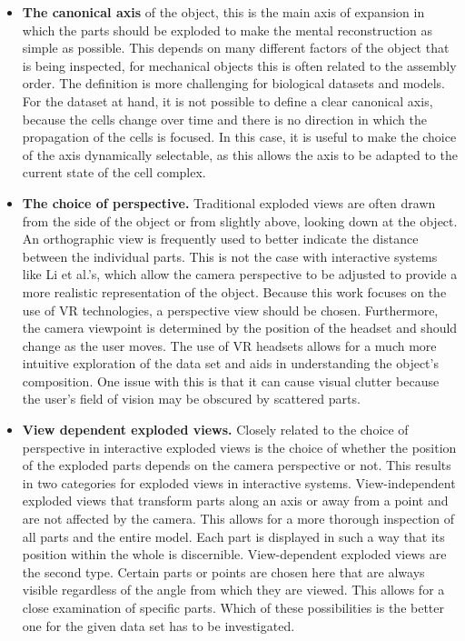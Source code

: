 \begin{itemize}
	\item \textbf{The canonical axis} of the object, this is the main axis of expansion in which the parts should be exploded to make the mental reconstruction as simple as possible. This depends on many different factors of the object that is being inspected, for mechanical objects this is often related to the assembly order. The definition is more challenging for biological datasets and models. For the dataset at hand, it is not possible to define a clear canonical axis, because the cells change over time and there is no direction in which the propagation of the cells is focused. In this case, it is useful to make the choice of the axis dynamically selectable, as this allows the axis to be adapted to the current state of the cell complex. 
	\item \textbf{The choice of perspective.} Traditional exploded views are often drawn from the side of the object or from slightly above, looking down at the object. An orthographic view is frequently used to better indicate the distance between the individual parts. 
	This is not the case with interactive systems like Li et al.'s, which allow the camera perspective to be adjusted to provide a more realistic representation of the object.\cite{Wilmot_Li_2008}
	Because this work focuses on the use of VR technologies, a perspective view should be chosen. 
	Furthermore, the camera viewpoint is determined by the position of the headset and should change as the user moves. 
	The use of VR headsets allows for a much more intuitive exploration of the data set and aids in understanding the object's composition. 
	One issue with this is that it can cause visual clutter because the user's field of vision may be obscured by scattered parts.
	\item \textbf{View dependent exploded views.} Closely related to the choice of perspective in interactive exploded views is the choice of whether the position of the exploded parts depends on the camera perspective or not. 
	This results in two categories for exploded views in interactive systems.
	View-independent exploded views that transform parts along an axis or away from a point and are not affected by the camera.
	This allows for a more thorough inspection of all parts and the entire model. 
	Each part is displayed in such a way that its position within the whole is discernible.
	View-dependent exploded views are the second type.
	Certain parts or points are chosen here that are always visible regardless of the angle from which they are viewed. 
	This allows for a close examination of specific parts.
	Which of these possibilities is the better one for the given data set has to be investigated.
\end{itemize}

